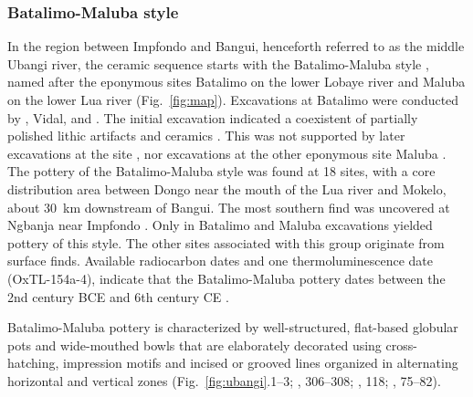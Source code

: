 \documentclass[smallextended,natbib]{svjour3}       %
\begin{document}
\subsubsection*{Batalimo-Maluba style}

In the region between Impfondo and Bangui, henceforth referred to as the middle Ubangi river, the ceramic sequence starts with the Batalimo-Maluba style \citep[75--82]{Seidensticker.2021e}, named after the eponymous sites Batalimo on the lower Lobaye river and Maluba on the lower Lua river (Fig.~\ref{fig:map}). Excavations at Batalimo were conducted by \citet{deBayledesHermens.1975}, Vidal, \citet{Kote.1992} and \citet{Ndanga.2010}. The initial excavation indicated a coexistent of partially polished lithic artifacts and ceramics \citep{Aumassip.1975}. This was not supported by later excavations at the site \citep{Ndanga.2010}, nor excavations at the other eponymous site Maluba \citep{Eggert.1987c}. The pottery of the Batalimo-Maluba style was found at 18 sites, with a core distribution area between Dongo near the mouth of the Lua river and Mokelo, about 30~km downstream of Bangui. The most southern find was uncovered at Ngbanja near Impfondo \citep[Fig.~\ref{fig:timeslices_1_eia}B--E;][81 Fig.~25]{Seidensticker.2021e}. Only in Batalimo and Maluba excavations yielded pottery of this style. The other sites associated with this group originate from surface finds. Available radiocarbon dates and one thermoluminescence date (OxTL-154a-4), indicate that the Batalimo-Maluba pottery dates between the 2nd century BCE and 6th century CE \citep[Fig.~\ref{fig:chrono}; S1; Tab.~S1;][80 Fig.~28]{Seidensticker.2021e}. 

Batalimo-Maluba pottery is characterized by well-structured, flat-based globular pots and wide-mouthed bowls that are elaborately decorated using cross-hatching, impression motifs and incised or grooved lines organized in alternating horizontal and vertical zones (Fig.~\ref{fig:ubangi}.1--3; \citeauthor{Eggert.1993} \citeyear{Eggert.1993}, 306--308; \citeauthor{Seidensticker.2016b} \citeyear{Seidensticker.2016b}, 118; \citeyear{Seidensticker.2021e}, 75--82).
\end{document}
